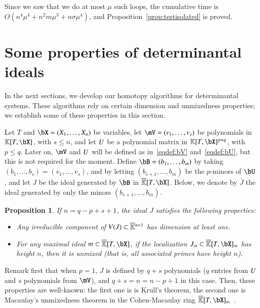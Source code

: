 \documentclass[amsthm]{elsart}
\newtheorem{proposition}[definition]{Proposition}
\begin{document}
Since we saw that we do at most $\mu$ such loops, the cumulative time
is $O(n^4 \mu^4 + n^2 m \mu^3 + n \sigma \mu^4)$, and
Proposition~\ref{prop:testisolated} is proved.


\section{Some properties of determinantal ideals}\label{sec:check}

In the next sections, we develop our homotopy algorithms for
determinantal systems. These algorithms rely on certain dimension and
unmixedness properties; we establish some of these properties in this
section.

Let $T$ and $\bX=(X_1,\dots,X_n)$ be variables, let $\mV=(v_1,\dots,v_s)$ be
polynomials in $\KK[T,\bX]$, with $s \le n$, and let ${U}$ be a polynomial
matrix in $\KK[T,\bX]^{p \times q}$, with $p \le q$. Later on, $\mV$ and ${U}$
will be defined as in~\eqref{eqdef:bV} and~\eqref{eqdef:bU}, but this is not
required for the moment. Define $\bB=(b_1,\dots,b_m)$ by taking $(b_1,\dots,b_s)
= (v_1,\dots,v_s)$, and by letting $(b_{s+1},\dots,b_m)$ be the $p$-minors of
$\bU$, and let $J$ be the ideal generated by $\bB$ in $\KKbar[T,\bX]$. Below, we
denote by $\bar J$ the ideal generated by only the minors
 $(b_{s+1},\dots,b_m)$.
\begin{proposition}\label{prop:KH1H2}
  If $n=q-p+s+1$, the ideal $J$ satisfies the following properties:
\begin{itemize}[leftmargin=8mm]
\item Any irreducible component of $V(J) \subset
  \overline{\mathbb{K}}{}^{n+1}$ has dimension at least one.
\item For any maximal ideal $\m \subset\KKbar[T,\bX]$,
  if the localization $J_\m \subset \KKbar[T,\bX]_\m$ has height $n$,
  then it is unmixed (that is, all associated primes have height $n$).
\end{itemize}
\end{proposition}
Remark first that when $p=1$, $J$ is defined by $q+s$ polynomials ($q$
entries from ${U}$ and $s$ polynomials from $\mV$), and $q+s=n=n-p+1$ in
this case. Then, these properties are well-known: the first one is is
Krull's theorem, the second one is Macaulay's unmixedness theorem in
the Cohen-Macaulay ring
$\KKbar[T,\bX]_\m$~\cite[Corollary~18.14]{Eisenbud95}.
\end{document}
